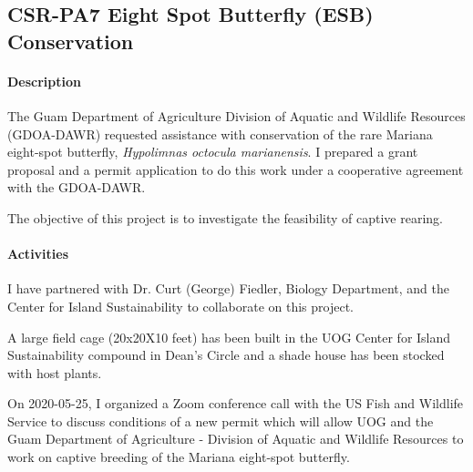 \subsection{CSR-PA7 Eight Spot Butterfly (ESB) Conservation}
\begin{refsection}

\paragraph{Description}

The Guam Department of Agriculture Division of Aquatic and Wildlife
Resources (GDOA-DAWR) requested assistance with conservation of the
rare Mariana eight-spot butterfly, \emph{Hypolimnas octocula marianensis}. I prepared a grant proposal and a permit application to do this work under a cooperative agreement with the GDOA-DAWR.

The objective of this project is to investigate the feasibility of captive rearing.

\paragraph{Activities}

I have partnered with Dr. Curt (George) Fiedler, Biology Department, and the Center for Island Sustainability to collaborate on this project.

A large field cage (20x20X10 feet) has been built in the UOG Center for Island Sustainability compound in Dean's Circle and a shade house has been stocked with host plants. 

On 2020-05-25, I organized a Zoom conference call with the US Fish and Wildlife Service to discuss conditions of a new permit which will allow UOG and the Guam Department of Agriculture - Division of Aquatic and Wildlife Resources to work on captive breeding of the Mariana eight-spot butterfly.
\begin{comment}
\paragraph{Plans 15JUN2021-14JUN2022}

I will assist in requesting a new permit from USFWS to work with the eight-spot butterfly. Experimental facilities will be constructed at the Center for Island Sustainability compound on the UOG campus.

\paragraph{Plans 15JUN2022-14JUN2023}

Eight-spot butterfly breeding experiments will commence within the next 2 months.
\end{comment}


\end{refsection}



